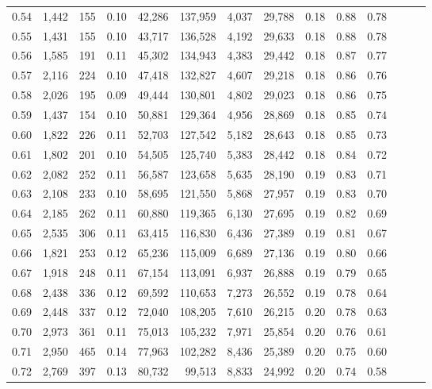 \begin{tabular}{rrrrrrrrrrrrrr}
0.54 &  1,442 &    155 &  0.10 &   42,286 &  137,959 &   4,037 &  29,788 &  0.18 &  0.88 &      0.78 \\
0.55 &  1,431 &    155 &  0.10 &   43,717 &  136,528 &   4,192 &  29,633 &  0.18 &  0.88 &      0.78 \\
0.56 &  1,585 &    191 &  0.11 &   45,302 &  134,943 &   4,383 &  29,442 &  0.18 &  0.87 &      0.77 \\
0.57 &  2,116 &    224 &  0.10 &   47,418 &  132,827 &   4,607 &  29,218 &  0.18 &  0.86 &      0.76 \\
0.58 &  2,026 &    195 &  0.09 &   49,444 &  130,801 &   4,802 &  29,023 &  0.18 &  0.86 &      0.75 \\
0.59 &  1,437 &    154 &  0.10 &   50,881 &  129,364 &   4,956 &  28,869 &  0.18 &  0.85 &      0.74 \\
0.60 &  1,822 &    226 &  0.11 &   52,703 &  127,542 &   5,182 &  28,643 &  0.18 &  0.85 &      0.73 \\
0.61 &  1,802 &    201 &  0.10 &   54,505 &  125,740 &   5,383 &  28,442 &  0.18 &  0.84 &      0.72 \\
0.62 &  2,082 &    252 &  0.11 &   56,587 &  123,658 &   5,635 &  28,190 &  0.19 &  0.83 &      0.71 \\
0.63 &  2,108 &    233 &  0.10 &   58,695 &  121,550 &   5,868 &  27,957 &  0.19 &  0.83 &      0.70 \\
0.64 &  2,185 &    262 &  0.11 &   60,880 &  119,365 &   6,130 &  27,695 &  0.19 &  0.82 &      0.69 \\
0.65 &  2,535 &    306 &  0.11 &   63,415 &  116,830 &   6,436 &  27,389 &  0.19 &  0.81 &      0.67 \\
0.66 &  1,821 &    253 &  0.12 &   65,236 &  115,009 &   6,689 &  27,136 &  0.19 &  0.80 &      0.66 \\
0.67 &  1,918 &    248 &  0.11 &   67,154 &  113,091 &   6,937 &  26,888 &  0.19 &  0.79 &      0.65 \\
0.68 &  2,438 &    336 &  0.12 &   69,592 &  110,653 &   7,273 &  26,552 &  0.19 &  0.78 &      0.64 \\
0.69 &  2,448 &    337 &  0.12 &   72,040 &  108,205 &   7,610 &  26,215 &  0.20 &  0.78 &      0.63 \\
0.70 &  2,973 &    361 &  0.11 &   75,013 &  105,232 &   7,971 &  25,854 &  0.20 &  0.76 &      0.61 \\
0.71 &  2,950 &    465 &  0.14 &   77,963 &  102,282 &   8,436 &  25,389 &  0.20 &  0.75 &      0.60 \\
0.72 &  2,769 &    397 &  0.13 &   80,732 &   99,513 &   8,833 &  24,992 &  0.20 &  0.74 &      0.58 \\

\end{tabular}

